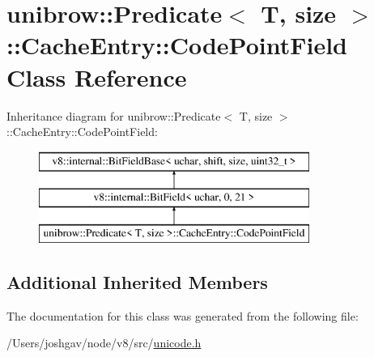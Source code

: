 \hypertarget{classunibrow_1_1_predicate_1_1_cache_entry_1_1_code_point_field}{}\section{unibrow\+:\+:Predicate$<$ T, size $>$\+:\+:Cache\+Entry\+:\+:Code\+Point\+Field Class Reference}
\label{classunibrow_1_1_predicate_1_1_cache_entry_1_1_code_point_field}
Inheritance diagram for unibrow\+:\+:Predicate$<$ T, size $>$\+:\+:Cache\+Entry\+:\+:Code\+Point\+Field\+:\begin{figure}[H]
\begin{center}
\leavevmode
\includegraphics[height=3.000000cm]{classunibrow_1_1_predicate_1_1_cache_entry_1_1_code_point_field}
\end{center}
\end{figure}
\subsection*{Additional Inherited Members}


The documentation for this class was generated from the following file\+:\begin{DoxyCompactItemize}
\item 
/\+Users/joshgav/node/v8/src/\hyperlink{unicode_8h}{unicode.\+h}\end{DoxyCompactItemize}
